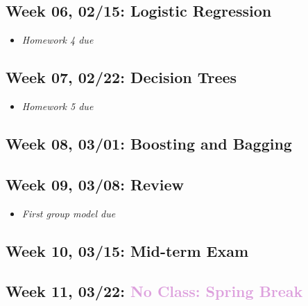 \documentclass[11pt,]{article}
\providecommand{\tightlist}{%
  \setlength{\itemsep}{0pt}\setlength{\parskip}{0pt}}
\begin{document}
\hypertarget{week-06-0215-logistic-regression}{%
\subsection{Week 06, 02/15: Logistic
Regression}\label{week-06-0215-logistic-regression}}

\begin{itemize}
\tightlist
\item
  \emph{\textcolor{Bittersweet}{Homework 4 due}}
\end{itemize}

\hypertarget{week-07-0222-decision-trees}{%
\subsection{Week 07, 02/22: Decision
Trees}\label{week-07-0222-decision-trees}}

\begin{itemize}
\tightlist
\item
  \emph{\textcolor{Bittersweet}{Homework 5 due}}
\end{itemize}

\hypertarget{week-08-0301-boosting-and-bagging}{%
\subsection{Week 08, 03/01: Boosting and
Bagging}\label{week-08-0301-boosting-and-bagging}}

\hypertarget{week-09-0308-review}{%
\subsection{Week 09, 03/08: Review}\label{week-09-0308-review}}

\begin{itemize}
\tightlist
\item
  \emph{\textcolor{Bittersweet}{First group model due}}
\end{itemize}

\hypertarget{week-10-0315-mid-term-exam}{%
\subsection{Week 10, 03/15: Mid-term
Exam}\label{week-10-0315-mid-term-exam}}

\hypertarget{week-11-0322}{%
\subsection{\texorpdfstring{Week 11, 03/22:
\textcolor{Plum}{No Class: Spring Break}}{Week 11, 03/22: }}\label{week-11-0322}}
\end{document}
